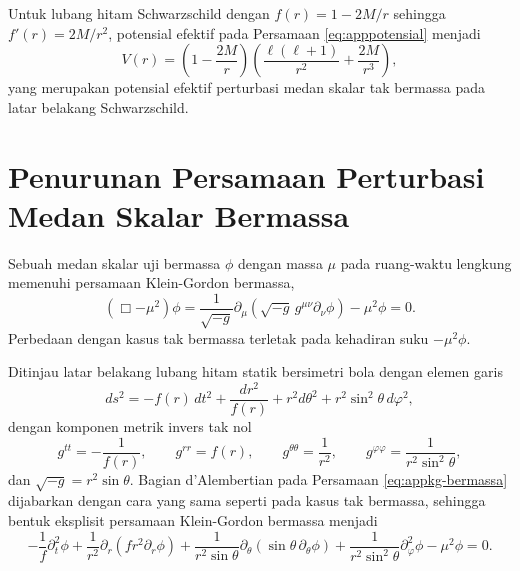 Untuk lubang hitam Schwarzschild dengan $f(r) = 1 - 2M/r$ sehingga $f'(r) = 2M/r^2$,
potensial efektif pada Persamaan \eqref{eq:apppotensial} menjadi
\begin{equation}
    V(r) = \left( 1 - \frac{2M}{r} \right)
    \left( \frac{\ell(\ell+1)}{r^2} + \frac{2M}{r^3} \right),
    \label{eq:apppotensial-schwarzschild}
\end{equation}
yang merupakan potensial efektif perturbasi medan skalar tak bermassa pada latar
belakang Schwarzschild.

\section{Penurunan Persamaan Perturbasi Medan Skalar Bermassa}
\label{app:perturbasi-skalar-massive}

 
Sebuah medan skalar uji bermassa $\phi$ dengan massa $\mu$ pada ruang-waktu lengkung
memenuhi persamaan Klein-Gordon bermassa,
\begin{equation}
    \left( \Box - \mu^2 \right) \phi
    = \frac{1}{\sqrt{-g}} \partial_\mu \left( \sqrt{-g}\, g^{\mu\nu} \partial_\nu \phi \right)
    - \mu^2 \phi = 0.
    \label{eq:appkg-bermassa}
\end{equation}
Perbedaan dengan kasus tak bermassa terletak pada kehadiran suku $-\mu^2 \phi$.
 
Ditinjau latar belakang lubang hitam statik bersimetri bola dengan elemen garis
\begin{equation}
    ds^2 = -f(r)\, dt^2 + \frac{dr^2}{f(r)} + r^2 d\theta^2 + r^2 \sin^2\theta\, d\varphi^2,
    \label{eq:appmetrik-b}
\end{equation}
dengan komponen metrik invers tak nol
\begin{equation}
    g^{tt} = -\frac{1}{f(r)}, \qquad g^{rr} = f(r), \qquad
    g^{\theta\theta} = \frac{1}{r^2}, \qquad g^{\varphi\varphi} = \frac{1}{r^2 \sin^2\theta},
\end{equation}
dan $\sqrt{-g} = r^2 \sin\theta$. Bagian d'Alembertian pada Persamaan
\eqref{eq:appkg-bermassa} dijabarkan dengan cara yang sama seperti pada kasus tak
bermassa, sehingga bentuk eksplisit persamaan Klein-Gordon bermassa menjadi
\begin{equation}
    -\frac{1}{f} \partial_t^2 \phi
    + \frac{1}{r^2} \partial_r \left( f r^2 \partial_r \phi \right)
    + \frac{1}{r^2 \sin\theta} \partial_\theta \left( \sin\theta\, \partial_\theta \phi \right)
    + \frac{1}{r^2 \sin^2\theta} \partial_\varphi^2 \phi
    - \mu^2 \phi = 0.
    \label{eq:appeom-eksplisit-b}
\end{equation}
 
